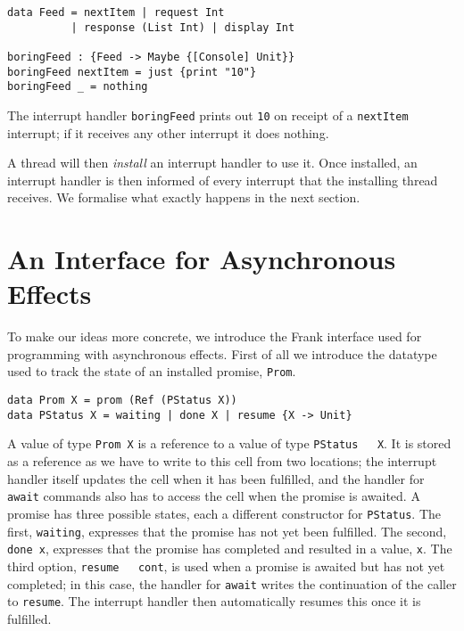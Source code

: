 \documentclass[msc,deptreport,cs]{infthesis} %
\newcommand{\code}[1]{\lstinline{#1}}
\newcommand{\todo}[1]
           {{\par\noindent\small\color{RoyalPurple}
  \framebox{\parbox{\dimexpr\linewidth-2\fboxsep-2\fboxrule}
    {\textbf{TODO:} #1}}}}
\begin{document}
\begin{lstlisting}
data Feed = nextItem | request Int
          | response (List Int) | display Int

boringFeed : {Feed -> Maybe {[Console] Unit}}
boringFeed nextItem = just {print "10"}
boringFeed _ = nothing
\end{lstlisting}

\noindent The interrupt handler \code{boringFeed} prints out \code{10} on
receipt of a \code{nextItem} interrupt; if it receives any other interrupt it
does nothing.

A thread will then \emph{install} an interrupt handler to use it. Once
installed, an interrupt handler is then informed of every interrupt that the
installing thread receives. We formalise what exactly happens in the next section.

\todo{Fix this?}





\section{An Interface for Asynchronous Effects}

To make our ideas more concrete, we introduce the Frank interface used for
programming with asynchronous effects. First of all we introduce the datatype
used to track the state of an installed promise, \code{Prom}.

\begin{lstlisting}
data Prom X = prom (Ref (PStatus X))
data PStatus X = waiting | done X | resume {X -> Unit}
\end{lstlisting}

A value of type \code{Prom X} is a reference to a value of type \code{PStatus
  X}. It is stored as a reference as we have to write to this cell from two
locations; the interrupt handler itself updates the cell when it has been
fulfilled, and the handler for \code{await} commands also has to access the cell
when the promise is awaited.
%
A promise has three possible states, each a different constructor for
\code{PStatus}. The first, \code{waiting}, expresses that the promise has not
yet been fulfilled. The second, \code{done x}, expresses that the promise has
completed and resulted in a value, \code{x}. The third option, \code{resume
  cont}, is used when a promise is awaited but has not yet completed; in this
case, the handler for \code{await} writes the continuation of the caller to
\code{resume}. The interrupt handler then automatically resumes this once it is
fulfilled.
\end{document}
